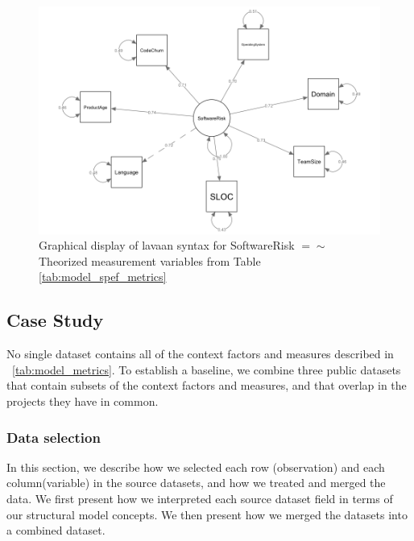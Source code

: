 \begin{figure}
	\centering
		\includegraphics[width=1\textwidth]{syntax_swrisk_asmeasuredby.png}
		\caption{Graphical display of lavaan syntax for SoftwareRisk $=\sim$ Theorized measurement variables from Table  \ref{tab:model_spef_metrics}}
		\label{fig:model_example_syntax_asmeasuredby}	
\end{figure}


\subsection{Case Study}
\label{sec:evaluation_openhub}
No single dataset contains all of the context factors and measures described in ~\ref{tab:model_metrics}. To establish a baseline, we combine three public datasets that contain subsets of the context factors and measures, and that overlap in the projects they have in common.

\subsubsection{Data selection}
\label{sec:evaluation_openhub_selection}
In this section, we describe how we selected each row (observation) and each column(variable) in the source datasets, and how we treated and merged the data. We first present how we interpreted each source dataset field in terms of our structural model concepts. We then present how we merged the datasets into a combined dataset.

